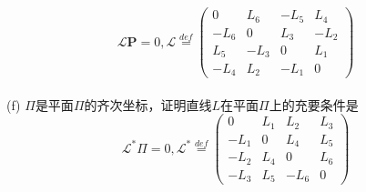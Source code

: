 \begin{problem}
        \begin{equation*}
            \mathcal{L} \mathbf{P}=0,\mathcal{L}\overset{def}{=} \begin{pmatrix}
                0    & L_6  & -L_5 & L_4 \\
                -L_6 & 0    & L_3  & -L_2 \\
                L_5  & -L_3 & 0    & L_1 \\
                -L_4 & L_2  & -L_1 & 0
               \end{pmatrix}
        \end{equation*}
    \\(f) $\Pi$是平面$\Pi$的齐次坐标，证明直线$L$在平面$\Pi$上的充要条件是
        \begin{equation*}
            \mathcal{L^*} \Pi=0,\mathcal{L^*}\overset{def}{=} \begin{pmatrix}
                0    & L_1  & L_2  & L_3 \\
                -L_1 & 0    & L_4  & L_5 \\
                -L_2 & L_4  & 0    & L_6 \\
                -L_3 & L_5  & -L_6 & 0
            \end{pmatrix}
        \end{equation*}
\end{problem}

